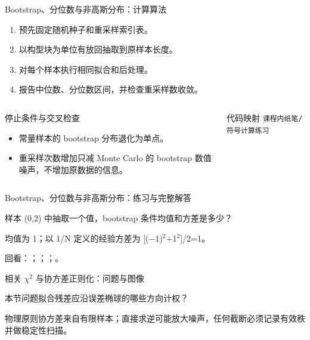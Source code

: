 \begin{frame}[t]{Bootstrap、分位数与非高斯分布：计算算法}
\footnotesize
{}\begin{enumerate}
\item 预先固定随机种子和重采样索引表。
\item 以构型块为单位有放回抽取到原样本长度。
\item 对每个样本执行相同拟合和后处理。
\item 报告中位数、分位数区间，并检查重采样数收敛。
\end{enumerate}\begin{columns}[T,onlytextwidth]
\begin{block}{停止条件与交叉检查}\scriptsize\begin{itemize}
\item[\CheckMark] 常量样本的 bootstrap 分布退化为单点。
\item[\CheckMark] 重采样次数增加只减 Monte Carlo 的 bootstrap 数值噪声，不增加原数据的信息。
\end{itemize}\end{block}
\begin{block}{代码映射}
\scriptsize \texttt{课程内纸笔/\allowbreak{}符号计算练习}
\end{block}\end{columns}\end{frame}

\begin{frame}[t]{Bootstrap、分位数与非高斯分布：练习与完整解答}
\footnotesize
\begin{block}{}样本 (0,2) 中抽取一个值，bootstrap 条件均值和方差是多少？\end{block}
\begin{exampleblock}{}均值为 1；以 1/\allowbreak{}N 定义的经验方差为 [(\ensuremath{-}1)\ensuremath{^{2}}+1\ensuremath{^{2}}]/\allowbreak{}2=1。\end{exampleblock}
\vfill
\scriptsize 回看：；；；。
\end{frame}

\begin{frame}[t]{相关 \ensuremath{\chi}\ensuremath{^{2}} 与协方差正则化：问题与图像}
\footnotesize
\begin{block}{本节问题}拟合残差应沿误差椭球的哪些方向计权？\end{block}
\begin{block}{物理原则}\quad 协方差来自有限样本；直接求逆可能放大噪声，任何截断必须记录有效秩并做稳定性扫描。\end{block}
\end{frame}

